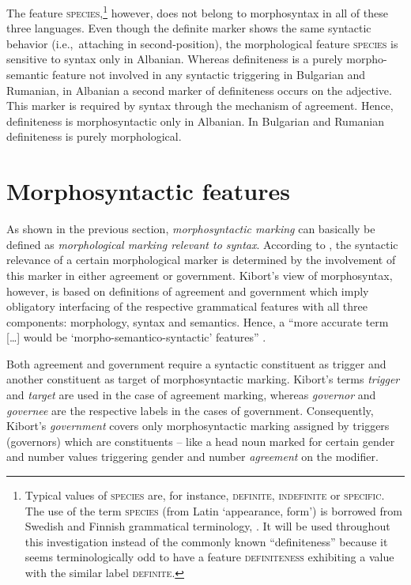 The feature \textsc{species},\footnote{Typical values of \textsc{species} are, for instance, \textsc{definite, indefinite} or \textsc{specific}. The use of the term \textsc{species} (from Latin ‘appearance, form’) is borrowed from Swedish and Finnish grammatical terminology, \cite[cf., e.g.][]{holm-etal1970,itkonen-t1980a}. It will be used throughout this investigation instead of the commonly known “definiteness” because it seems terminologically odd to have a feature \textsc{definiteness} exhibiting a value with the similar label \textsc{definite}.} however, does not belong to morphosyntax in all of these three languages. Even though the definite marker shows the same syntactic behavior (i.e.,~attaching in second-position), the morphological feature \textsc{species} is sensitive to syntax only in Albanian. Whereas definiteness is a purely morpho-semantic feature not involved in any syntactic triggering in Bulgarian and Rumanian, in Albanian a second marker of definiteness occurs on the adjective. This marker is required by syntax through the mechanism of agreement. Hence, definiteness is morphosyntactic only in Albanian. In Bulgarian and Rumanian definiteness is purely morphological.

\section{Morphosyntactic features} \label{crit eval}
As shown in the previous section, \emph{morphosyntactic marking} can basically be defined as \emph{morphological marking relevant to syntax}. According to \cite{kibort2010a}, the syntactic relevance of a certain morphological marker is determined by the involvement of this marker in either agreement or government. Kibort's view of morphosyntax, however, is based on definitions of {agreement} and {government} which imply obligatory interfacing of the respective grammatical features with all three components: morphology, syntax and semantics. Hence, a “more accurate term [\dots] would be ‘morpho-semantico-syntactic’ features” \citep[??]{kibort2010a}.

Both agreement and government require a syntactic constituent as trigger and another constituent as target of morphosyntactic marking. Kibort's terms \emph{trigger} and \emph{target} are used in the case of agreement marking, whereas \emph{governor} and \emph{governee} are the respective labels in the cases of government. Consequently, Kibort's \emph{government} covers only morphosyntactic marking assigned by triggers (governors) which are constituents – like a head noun marked for certain gender and number values triggering gender and number \emph{agreement} on the modifier.

